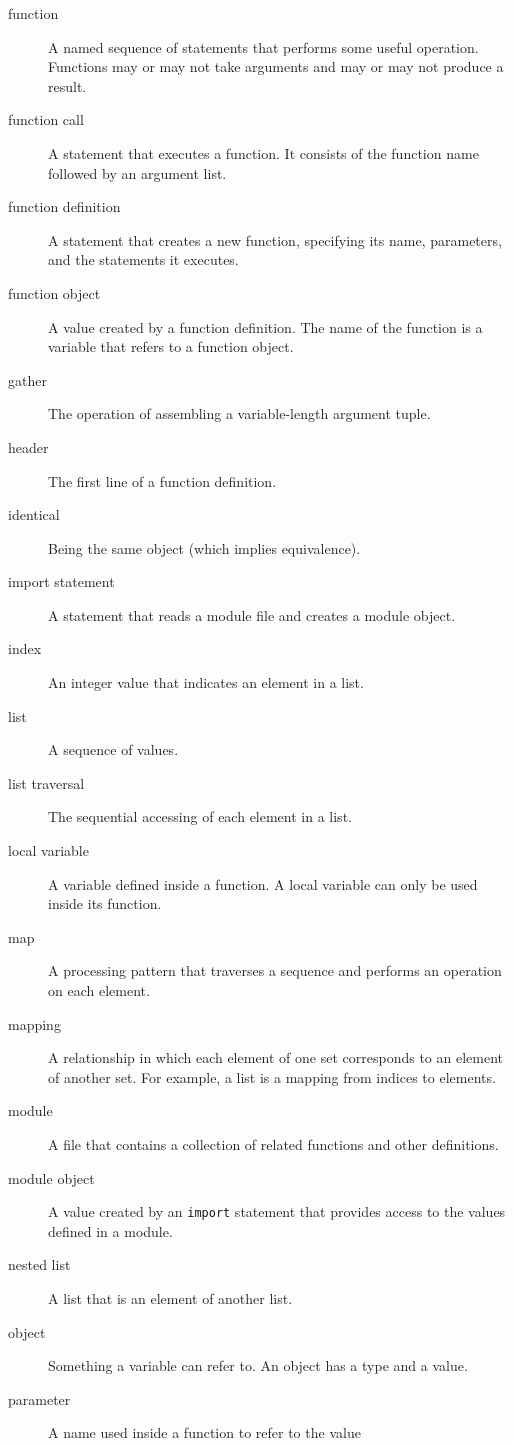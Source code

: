 \documentclass{article}
\begin{document}
\begin{description}
\item [function] A named sequence of statements that performs some
    useful operation. Functions may or may not take arguments and may
    or may not produce a result.
\item [function call] A statement that executes a function. It
    consists of the function name followed by an argument list.
\item [function definition] A statement that creates a new function,
    specifying its name, parameters, and the statements it executes.
\item [function object] A value created by a function definition. The
    name of the function is a variable that refers to a function
    object.
\item [gather] The operation of assembling a variable-length argument
    tuple.
\item [header] The first line of a function definition.
\item [identical] Being the same object (which implies equivalence).
\item [import statement] A statement that reads a module file and
    creates a module object.
\item [index] An integer value that indicates an element in a list.
\item [list] A sequence of values.
\item [list traversal] The sequential accessing of each element in a list.
\item [local variable] A variable defined inside a function. A local
    variable can only be used inside its function.
\item [map] A processing pattern that traverses a sequence and performs an operation on each element.
\item [mapping] A relationship in which each element of one set corresponds to an element of another set. For example, a list is a mapping from indices to elements.
\item [module] A file that contains a collection of related functions
    and other definitions.
\item [module object] A value created by an \verb|import| statement
    that provides access to the values defined in a module.
\item [nested list] A list that is an element of another list.
\item [object] Something a variable can refer to. An object has a type and a value.
\item [parameter] A name used inside a function to refer to the value

\end{description}
\end{document}
